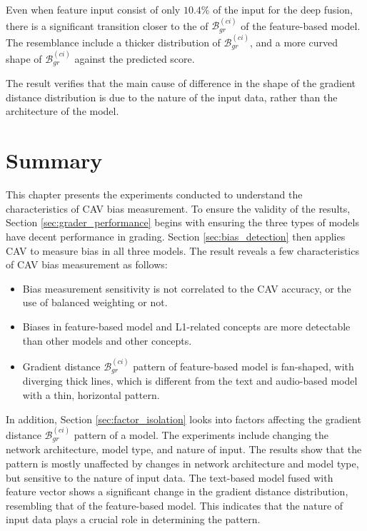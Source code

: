Even when feature input consist of only $10.4\%$ of the input for the deep fusion, there is a significant transition closer to the of $\mathcal{B}_{gr}^{(ci)}$ of the feature-based model. The resemblance include a thicker distribution of $\mathcal{B}_{gr}^{(ci)}$, and a more curved shape of $\mathcal{B}_{gr}^{(ci)}$ against the predicted score.

The result verifies that the main cause of difference in the shape of the gradient distance distribution is due to the nature of the input data, rather than the architecture of the model.

\section{Summary}
This chapter presents the experiments conducted to understand the characteristics of CAV bias measurement. To ensure the validity of the results, Section \ref{sec:grader_performance} begins with ensuring the three types of models have decent performance in grading. Section \ref{sec:bias_detection} then applies CAV to measure bias in all three models. The result reveals a few characteristics of CAV bias measurement as follows:

\begin{itemize}
    \item Bias measurement sensitivity is not correlated to the CAV accuracy, or the use of balanced weighting or not.
    \item Biases in feature-based model and L1-related concepts are more detectable than other models and other concepts.
    \item Gradient distance  $\mathcal{B}_{gr}^{(ci)}$ pattern of feature-based model is fan-shaped, with diverging thick lines, which is different from the text and audio-based model with a thin, horizontal pattern.
\end{itemize}

In addition, Section \ref{sec:factor_isolation} looks into factors affecting the gradient distance $\mathcal{B}_{gr}^{(ci)}$ pattern of a model. The experiments include changing the network architecture, model type, and nature of input. The results show that the pattern is mostly unaffected by changes in network architecture and model type, but sensitive to the nature of input data. The text-based model fused with feature vector shows a significant change in the gradient distance distribution, resembling that of the feature-based model. This indicates that the nature of input data plays a crucial role in determining the pattern.